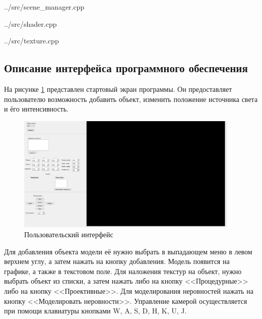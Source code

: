 \begin{lstinputlisting}[
	caption={Алгоритм растеризации треугольника},
	label={lst:rasterize_triangle},
	linerange={33-69}
	]{../src/scene_manager.cpp}
\end{lstinputlisting}

\begin{lstinputlisting}[
	caption={Алгоритм преобразования вершин в экранное пространство},
	label={lst:conver_vertex},
	linerange={5-28}
	]{../src/shader.cpp}
\end{lstinputlisting}

\begin{lstinputlisting}[
	caption={Алгоритм текстуризации},
	label={lst:texture},
	linerange={10-35}
	]{../src/texture.cpp}
\end{lstinputlisting}

\subsection{Описание интерфейса программного обеспечения}
На рисунке \ref{fig:interface} представлен стартовый экран программы.
Он предоставляет пользователю возможность добавить объект, изменить положение источника света и ёго интенсивность.
\begin{figure}[h]
	\centering
	\includegraphics[width=0.95\textwidth]{img/examples/interface.png}
	\caption{Пользовательский интерфейс}
	\label{fig:interface}
\end{figure}

Для добавления объекта модели её нужно выбрать в выпадающем меню в левом верхнем углу, а затем нажать на кнопку добавления. Модель появится на графике, а также в текстовом поле.
Для наложения текстур на объект, нужно выбрать объект из списки, а затем нажать либо на кнопку <<Процедурные>> либо на кнопку <<Проективные>>.
Для моделирования неровностей нажать на кнопку <<Моделировать неровности>>.
Управление камерой осуществляется при помощи клавиатуры кнопками W, A, S, D, H, K, U, J.

